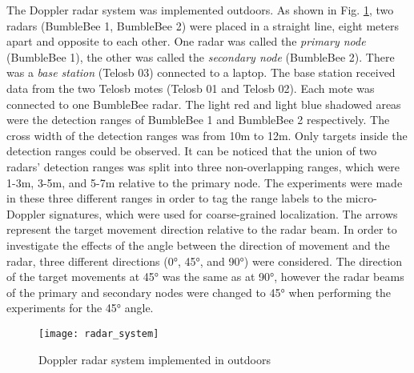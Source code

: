 The Doppler radar system was implemented outdoors. As shown in Fig.  \ref{fig_rs}, two radars (BumbleBee 1, BumbleBee 2) were placed in a straight line, eight meters apart and opposite to each other. One radar was called the \textit{primary node} (BumbleBee 1), the other was called the \textit{secondary node} (BumbleBee 2). There was a \textit{base station} (Telosb 03) connected to a laptop. The base station received data from the two Telosb motes (Telosb 01 and Telosb 02). Each mote was connected to one BumbleBee radar. The light red and light blue shadowed areas were the detection ranges of BumbleBee 1 and BumbleBee 2 respectively. The cross width of the detection ranges was from 10m to 12m. Only targets inside the detection ranges could be observed. It can be noticed that the union of two radars’ detection ranges was split into three non-overlapping ranges, which were 1-3m, 3-5m, and 5-7m relative to the primary node. The experiments were made in these three different ranges in order to tag the range labels to the micro-Doppler signatures, which were used for coarse-grained localization. The arrows represent the target movement direction relative to the radar beam. In order to investigate the effects of the angle between the direction of movement and the radar, three different directions (\ang{0}, \ang{45}, and \ang{90}) were considered. The direction of the target movements at \ang{45} was the same as at \ang{90}, however the radar beams of the primary and secondary nodes were changed to \ang{45} when performing the experiments for the \ang{45} angle.
\begin{figure}[!t]
\centering
\texttt{[image: radar\_system]}
\caption{Doppler radar system implemented in outdoors}
\label{fig_rs}
\end{figure}